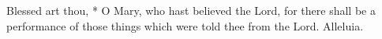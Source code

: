 Blessed art thou, * O Mary, who hast believed the Lord, for there shall be a performance of those things which were told thee from the Lord. Alleluia.






